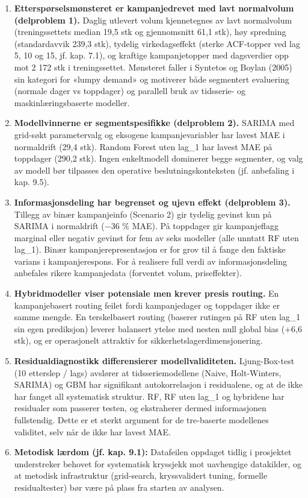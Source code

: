 \documentclass[
  norsk,
  11pt,
  a4paper,
]{article}
\begin{document}
\begin{enumerate}
\def\labelenumi{\arabic{enumi}.}
\item
  \textbf{Etterspørselsmønsteret er kampanjedrevet med lavt normalvolum
  (delproblem 1).} Daglig utlevert volum kjennetegnes av lavt
  normalvolum (treningssettets median 19,5 stk og gjennomsnitt 61,1
  stk), høy spredning (standardavvik 239,3 stk), tydelig virkedagseffekt
  (sterke ACF-topper ved lag 5, 10 og 15, jf. kap. 7.1), og kraftige
  kampanjetopper med dagsverdier opp mot 2 172 stk i treningssettet.
  Mønsteret faller i Syntetos og Boylan (2005) sin kategori for «lumpy
  demand» og motiverer både segmentert evaluering (normale dager vs
  toppdager) og parallell bruk av tidsserie- og maskinlæringsbaserte
  modeller.
\item
  \textbf{Modellvinnerne er segmentspesifikke (delproblem 2).} SARIMA
  med grid-søkt parametervalg og eksogene kampanjevariabler har lavest
  MAE i normaldrift (29,4 stk). Random Forest uten lag\_1 har lavest MAE
  på toppdager (290,2 stk). Ingen enkeltmodell dominerer begge
  segmenter, og valg av modell bør tilpasses den operative
  beslutningskonteksten (jf. anbefaling i kap. 9.5).
\item
  \textbf{Informasjonsdeling har begrenset og ujevn effekt (delproblem
  3).} Tillegg av binær kampanjeinfo (Scenario 2) gir tydelig gevinst
  kun på SARIMA i normaldrift (−36 \% MAE). På toppdager gir
  kampanjeflagg marginal eller negativ gevinst for fem av seks modeller
  (alle unntatt RF uten lag\_1). Binær kampanjerepresentasjon er for
  grov til å fange den faktiske varians i kampanjerespons. For å
  realisere full verdi av informasjonsdeling anbefales rikere
  kampanjedata (forventet volum, priseffekter).
\item
  \textbf{Hybridmodeller viser potensiale men krever presis routing.} En
  kampanjebasert routing feilet fordi kampanjedager og toppdager ikke er
  samme mengde. En terskelbasert routing (baserer rutingen på RF uten
  lag\_1 sin egen prediksjon) leverer balansert ytelse med nesten null
  global bias (+6,6 stk), og er operasjonelt attraktiv for
  sikkerhetslagerdimensjonering.
\item
  \textbf{Residualdiagnostikk differensierer modellvaliditeten.}
  Ljung-Box-test (10 etterslep / lags) avslører at tidsseriemodellene
  (Naive, Holt-Winters, SARIMA) og GBM har signifikant autokorrelasjon i
  residualene, og at de ikke har fanget all systematisk struktur. RF, RF
  uten lag\_1 og hybridene har residualer som passerer testen, og
  ekstraherer dermed informasjonen fullstendig. Dette er et sterkt
  argument for de tre-baserte modellenes validitet, selv når de ikke har
  lavest MAE.
\item
  \textbf{Metodisk lærdom (jf. kap. 9.1):} Datafeilen oppdaget tidlig i
  prosjektet understreker behovet for systematisk kryssjekk mot
  uavhengige datakilder, og at metodisk infrastruktur (grid-search,
  kryssvalidert tuning, formelle residualtester) bør være på plass fra
  starten av analysen.
\end{enumerate}
\end{document}
